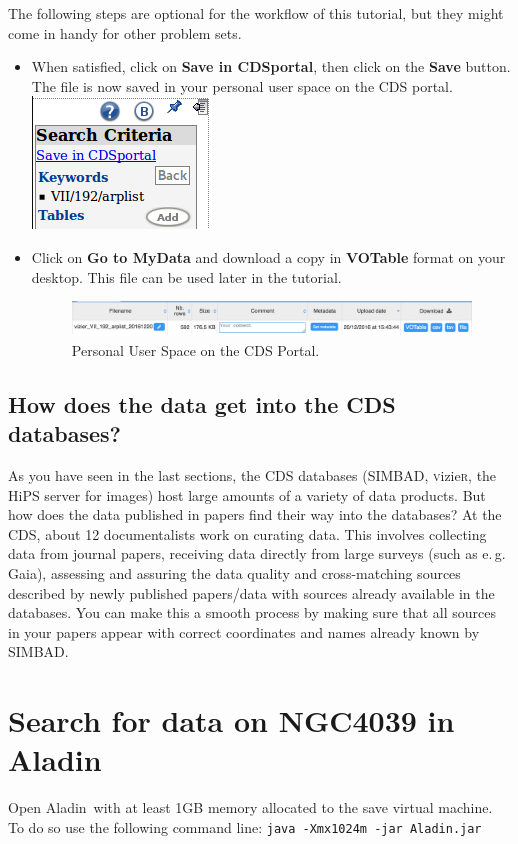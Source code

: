 \documentclass [a4paper, 12pt]{article}
\newcommand{\aladin}{{\textsc{A}{ladin}}}
\newcommand{\simbad}{{\textsc{SIMBAD}}}
\newcommand{\vizier}{{\textsc{v}izie\textsc{r}}}
\begin{document}
The following steps are optional for the workflow of this tutorial, but they 
might come in handy for other problem sets. 
\begin{itemize}
\item When satisfied, click on \textbf{Save in CDSportal}, then click 
on the \textbf{Save} button. The file is now saved in your personal 
user space on the CDS portal.\includegraphics[width=0.1  
\textwidth]{../images/vizier_saveto_CDSportal.png}
\item Click on \textbf{Go to MyData} and download a copy in 
\textbf{VOTable} format on your desktop. This file can be used later 
in the tutorial.
\begin{figure}[H]
\center
\includegraphics[width=1  \textwidth]{../images/cdsportal_mydata.jpg}
\caption{Personal User Space on the CDS Portal.}
\label{fig:download}
\end{figure}
\end{itemize}

\subsection{How does the data get into the CDS databases?}
As you have seen in the last sections, the CDS databases (\simbad, \vizier, the 
HiPS server for images) host large amounts of a variety of data products. But 
how does the data published in papers find their way into the databases? At the 
CDS, about 12 documentalists work on curating data. This involves collecting 
data from journal papers, receiving data directly from large surveys (such as 
e.\,g. Gaia), assessing and assuring the data quality and cross-matching 
sources described by newly published papers/data with sources already available 
in the databases. You can make this a smooth process by making sure that all 
sources in your papers appear with correct coordinates and names already known 
by \simbad. 

\section{Search for data on NGC4039 in \aladin}

Open \aladin\ with at least 1GB memory allocated to the save virtual 
machine. To do so use the following command line: \texttt{java -Xmx1024m -jar 
Aladin.jar}
\end{document}
